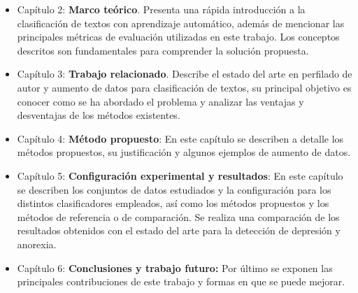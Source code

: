 \begin{itemize}
\item Capítulo 2: \textbf{Marco teórico}. Presenta una rápida introducción a la clasificación de textos con aprendizaje automático, además de mencionar las principales métricas de evaluación utilizadas en este trabajo. Los conceptos descritos son fundamentales para comprender la solución propuesta.


\item Capítulo 3: \textbf{Trabajo relacionado}. Describe el estado del arte en perfilado de autor y aumento de datos para clasificación de textos, su principal objetivo es conocer como se ha abordado el problema y analizar las ventajas y desventajas de los métodos existentes.



\item Capítulo 4: \textbf{Método propuesto}: En este capítulo se describen a detalle los métodos propuestos, su justificación y algunos ejemplos de aumento de datos.

\item Capítulo 5: \textbf{Configuración experimental y resultados}: En este capítulo se describen los conjuntos de datos estudiados y la configuración para los distintos clasificadores empleados, así como los métodos propuestos y los métodos de referencia o de comparación. Se realiza una comparación de los resultados obtenidos con el estado del arte para la detección de depresión y anorexia.

\item Capítulo 6: \textbf{Conclusiones y trabajo futuro:} Por último se exponen las principales contribuciones de este trabajo y formas en que se puede mejorar.

\end{itemize}

